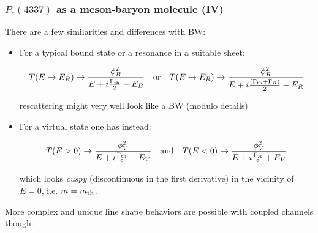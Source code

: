 \documentclass[utf8,10pt]{beamer}
\begin{document}
\begin{frame}
\frametitle{$P_{c}(4337)$ as a meson-baryon molecule (IV)}

There are a few similarities and differences with BW:

\begin{itemize}
  \item For a typical bound state or a resonance in a suitable sheet:

    \vspace{-0.25cm}
    {\small
      $$T(E \to E_{B}) \to \frac{\phi_B^2}{E + i \frac{\Gamma_{\rm th}}{2}- E_B} \quad \mbox{or} \quad  T(E \to E_{R}) \to \frac{\phi_R^2}{E + i \frac{(\Gamma_{\rm th} + \Gamma_R)}{2}- E_R}$$
    }

    rescattering might very well look like a BW (modulo details)

  \item For a virtual state one has instead:

        \vspace{-0.25cm}
    {\small
      $$T(E > 0) \to \frac{\phi_V^2}{E + i \frac{\Gamma_{\rm th}}{2}- E_V} \quad \mbox{and} \quad  T(E < 0) \to \frac{\phi_V^2}{E + i \frac{\Gamma_R}{2} + E_V}$$
    }

    which looks {\it cuspy} (discontinuous in the first derivative)
    in the vicinity of $E = 0$, i.e. $m = m_{\rm th}$.
\end{itemize}

More complex and unique line shape behaviors are possible
with coupled channels though.

\end{frame}
\end{document}
